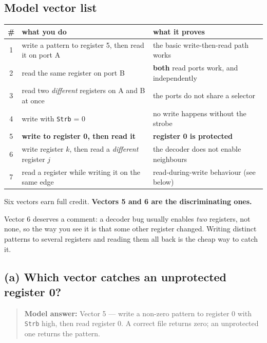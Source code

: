 \documentclass[11pt]{article}
\newcommand{\code}[1]{\texttt{#1}}
\begin{document}
\subsection*{Model vector list}

\begin{center}
\small
\begin{tabular}{c>{\raggedright\arraybackslash}p{5.4cm}>{\raggedright\arraybackslash}p{7.2cm}}
\toprule
\# & what you do & what it proves \\
\midrule
1 & write a pattern to register 5, then read it on port A & the basic write-then-read path works \\
2 & read the same register on port B & \textbf{both} read ports work, and independently \\
3 & read two \emph{different} registers on A and B at once & the ports do not share a selector \\
4 & write with \code{Strb} = 0 & no write happens without the strobe \\
5 & \textbf{write to register 0, then read it} & \textbf{register 0 is protected} \\
6 & write register $k$, then read a \emph{different} register $j$ & the decoder does not enable neighbours \\
7 & read a register while writing it on the same edge & read-during-write behaviour (see below) \\
\bottomrule
\end{tabular}
\end{center}

Six vectors earn full credit. \textbf{Vectors 5 and 6 are the discriminating
ones.}

Vector 6 deserves a comment: a decoder bug usually enables \emph{two} registers,
not none, so the way you see it is that some other register changed. Writing
distinct patterns to several registers and reading them all back is the cheap way
to catch it.

\subsection*{(a) Which vector catches an unprotected register 0?}

\begin{quote}
\textbf{Model answer:} Vector 5 --- write a non-zero pattern to register 0 with
\code{Strb} high, then read register 0. A correct file returns zero; an
unprotected one returns the pattern.
\end{quote}
\end{document}
